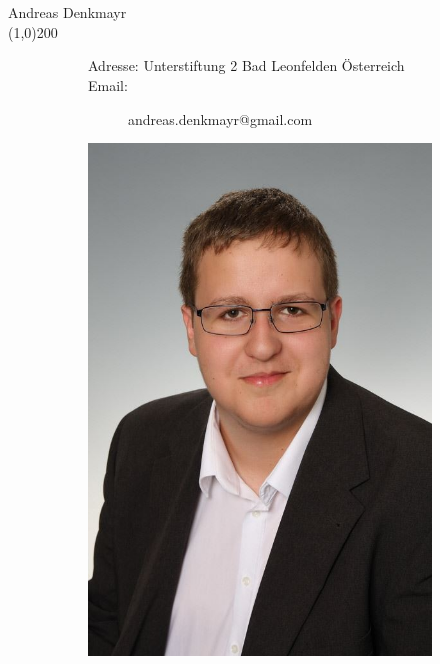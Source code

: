 \documentclass[FIPLY_base.tex]{subfiles}
\begin{document}
	\ \\
	\ \\
	{\Large Andreas Denkmayr}
	\ \\
	\line(1,0){200}
	\begin{figure}[H]
		\begin{subfigure}[b]{0.3\textwidth}
			Adresse: \newline
			Unterstiftung 2  Bad Leonfelden \newline
			Österreich \newline
			\newline
			Email:
			\begin{subfigure}[b]{0.2\textwidth}
				andreas.denkmayr@gmail.com
			\end{subfigure}
		\end{subfigure}
		\hfil
		\begin{subfigure}[b]{0.2\textwidth}
			\includegraphics[scale=0.1]{img/senki}
		\end{subfigure}
	\end{figure}
\end{document}
